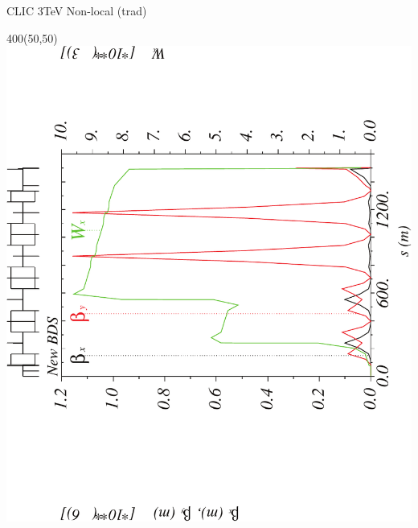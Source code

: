 \documentclass{beamer}
\begin{document}
\begin{frame}{CLIC 3TeV Non-local (trad)}
  \setlength{\TPHorizModule}{1pt}
  \setlength{\TPVertModule}{1pt}
 \begin{textblock}{400}(50,50)
 \includegraphics[scale=0.4,angle=-90]{CLICtrad_wx-crop.pdf}
 \end{textblock}
\end{frame}
\end{document}
